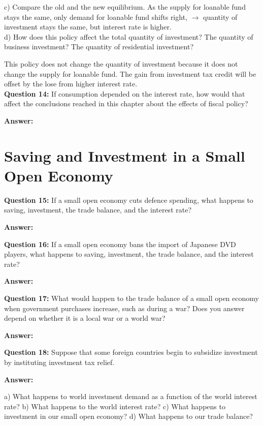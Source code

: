 \documentclass[a4paper, 11pt]{article}
\begin{document}
c) Compare the old and the new equilibrium. 
As the supply for loanable fund stays the same, only demand for loanable fund shifts right, $\rightarrow$ quantity of investment stays the same, but interest rate is higher. \\

d) How does this policy affect the total quantity of investment? The quantity of business investment? The quantity of residential investment?

This policy does not change the quantity of investment because it does not change the supply for loanable fund. The gain from investment tax credit will be offset by the lose from higher interest rate. \\

\textbf{Question 14:} If consumption depended on the interest rate, how would that affect the conclusions reached in this chapter about the effects of fiscal policy?

\textbf{Answer:}  \\

\section{Saving and Investment in a Small Open Economy}

\textbf{Question 15:} If a small open economy cuts defence spending, what happens to saving, investment, the trade balance, and the interest rate?

\textbf{Answer:}  

\textbf{Question 16:} If a small open economy bans the import of Japanese DVD players, what happens to saving, investment, the trade balance, and the interest rate?

\textbf{Answer:} 


\textbf{Question 17:} What would happen to the trade balance of a small open economy when government purchases increase, such as during a war? Does you answer depend on whether it is a local war or a world war?

\textbf{Answer:} 


\textbf{Question 18:} Suppose that some foreign countries begin to subsidize investment by instituting investment tax relief.

\textbf{Answer:} 

a) What happens to world investment demand as a function of the world interest rate?
b) What happens to the world interest rate?
c) What happens to investment in our small open economy?
d) What happens to our trade balance?
\end{document}
